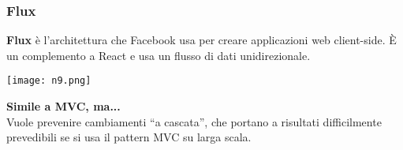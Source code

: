 \begin{frame}
\frametitle{Flux}
	\par
  	\textbf{Flux} è l’architettura che Facebook usa per creare applicazioni web client-side. È un complemento a React e usa un flusso di dati unidirezionale.\\
	\begin{flushleft}
		\texttt{[image: n9.png]}	
	\end{flushleft}	
	\textbf{Simile a MVC, ma...}\\
        Vuole prevenire cambiamenti “a cascata”, che portano a risultati difficilmente prevedibili se si usa il pattern MVC su larga scala.
\end{frame}



